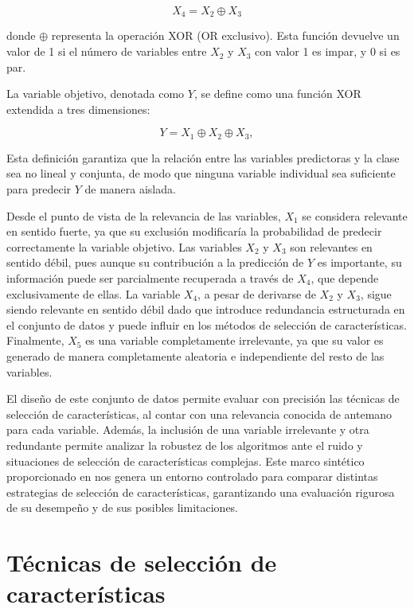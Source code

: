 \documentclass[a4paper,12pt]{article}
\begin{document}
\[
    X_4 = X_2 \oplus X_3
\]

\noindent donde \( \oplus \) representa la operación XOR (OR exclusivo). Esta función devuelve un valor de 1 si el número de variables entre \( X_2 \) y \( X_3 \) con valor 1 es impar, y 0 si es par.

La variable objetivo, denotada como \( Y \), se define como una función XOR extendida a tres dimensiones:

\[
    Y = X_1 \oplus X_2 \oplus X_3,
\]

\noindent Esta definición garantiza que la relación entre las variables predictoras y la clase sea no lineal y conjunta, de modo que ninguna variable individual sea suficiente para predecir \( Y \) de manera aislada.

Desde el punto de vista de la relevancia de las variables, \(X_1\) se considera relevante en sentido fuerte, ya que su exclusión modificaría la probabilidad de predecir correctamente la variable objetivo. Las variables \(X_2\) y \(X_3\) son relevantes en sentido débil, pues aunque su contribución a la predicción de \(Y\) es importante, su información puede ser parcialmente recuperada a través de \(X_4\), que depende exclusivamente de ellas. La variable \(X_4\), a pesar de derivarse de \(X_2\) y \(X_3\), sigue siendo relevante en sentido débil dado que introduce redundancia estructurada en el conjunto de datos y puede influir en los métodos de selección de características. Finalmente, \(X_5\) es una variable completamente irrelevante, ya que su valor es generado de manera completamente aleatoria e independiente del resto de las variables.

El diseño de este conjunto de datos permite evaluar con precisión las técnicas de selección de características, al contar con una relevancia conocida de antemano para cada variable. Además, la inclusión de una variable irrelevante y otra redundante permite analizar la robustez de los algoritmos ante el ruido y situaciones de selección de características complejas. Este marco sintético proporcionado en \cite{kohavi1997} nos genera un entorno controlado para comparar distintas estrategias de selección de características, garantizando una evaluación rigurosa de su desempeño y de sus posibles limitaciones.



\newpage
\section{Técnicas de selección de características}
\end{document}
